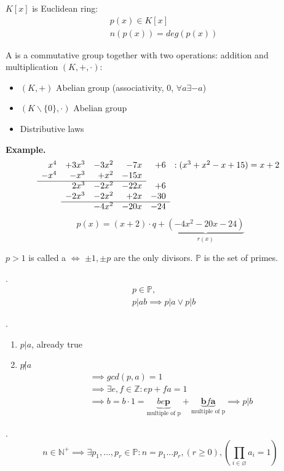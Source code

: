 $K[x]$ is Euclidean ring:
\begin{align*}
  &p(x) \in K[x] \\
  &n(p(x)) = deg(p(x))
\end{align*}

\begin{definition}
A  is a commutative group together with two operations: addition and multiplication
$(K, +, \cdot):$
\begin{itemize}
  \item $(K,+)$ Abelian group (associativity, 0, $\forall a \exists -a$)
  \item $(K \backslash \{0\}, \cdot)$ Abelian group
  \item Distributive laws
\end{itemize}
\end{definition}

\textbf{Example.}
\[
  \begin{array}{rrrrrr}
    x^4 & + 3x^3 & - 3x^2 & - 7x  & +6  & : ( x^3 + x^2 - x + 15) = x+2 \\
    -x^4 & - x^3  & + x^2  & - 15x &     &\\
    \cline{1-4}
         &  2x^3  & - 2x^2 & - 22x & + 6 &\\
         & -2x^3  & - 2x^2 & + 2x  & -30 &\\
    \cline{2-5}
         &        & - 4x^2 & - 20x & -24 &\\
  \end{array}
\]
\[
  p(x) = (x+2) \cdot q + \underbrace{(-4x^2-20x-24)}_{r(x)}
\]

\begin{definition}
$p>1$ is called a  $\iff$ $\pm 1, \pm p$ are the only divisors. $\mathbb{P}$ is the set of primes.
\end{definition}

\Theorem.
\begin{align*}
  & p\in \mathbb{P}, \\
  & p|ab \implies p|a \vee p|b
\end{align*}

\Proof.
\begin{enumerate}[{Case} 1)]
  \item $p|a$, already true\\
  \item $p \not| a$
  \begin{align*}
    &\implies gcd(p,a) = 1 \\
    &\implies \exists e,f \in \mathbb{Z}: ep + fa = 1 \\
    &\implies b = b \cdot 1 =
      \underbrace{b e \mathbf{p}}_{\text{multiple of p}} +
      \underbrace{\mathbf{b} f \mathbf{a}}_{\text{multiple of p}} \implies p|b
  \end{align*}
\end{enumerate}
\Theorem.
\[
  n \in \mathbb{N}^{+} \implies \exists p_1, \ldots ,p_r \in \mathbb{P}: n = p_1 \ldots p_r, (r \geq 0), (\prod_{i\in \varnothing} a_i = 1)
\]

